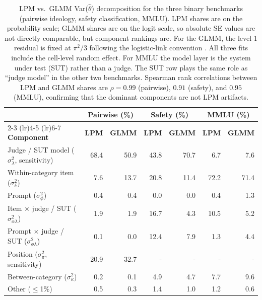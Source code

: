 \begin{table}[ht]
\centering
\caption{LPM vs.\ GLMM Var($\hat\theta$) decomposition for the three binary benchmarks (pairwise ideology, safety classification, MMLU). LPM shares are on the probability scale; GLMM shares are on the logit scale, so absolute SE values are not directly comparable, but component rankings are. For the GLMM, the level-1 residual is fixed at $\pi^2/3$ following the logistic-link convention \citep{nakagawa2010repeatability}. All three fits include the cell-level random effect. For MMLU the model layer is the system under test (SUT) rather than a judge. The SUT row plays the same role as ``judge model'' in the other two benchmarks. Spearman rank correlations between LPM and GLMM shares are $\rho = 0.99$ (pairwise), $0.91$ (safety), and $0.95$ (MMLU), confirming that the dominant components are not LPM artifacts.}
\label{tab:glmm_comparison}
\footnotesize
\begin{tabular}{lrrrrrr}
\toprule
& \multicolumn{2}{c}{\textbf{Pairwise (\%)}} & \multicolumn{2}{c}{\textbf{Safety (\%)}} & \multicolumn{2}{c}{\textbf{MMLU (\%)}} \\
\cmidrule(lr){2-3} \cmidrule(lr){4-5} \cmidrule(lr){6-7}
\textbf{Component} & \textbf{LPM} & \textbf{GLMM} & \textbf{LPM} & \textbf{GLMM} & \textbf{LPM} & \textbf{GLMM} \\
\midrule
Judge / SUT model ($\sigma^2_\lambda$, sensitivity) & 68.4 & 50.9 & 43.8 & 70.7 &  6.7 &  7.6 \\
Within-category item ($\sigma^2_\delta$)            &  7.6 & 13.7 & 20.8 & 11.4 & 72.2 & 71.4 \\
Prompt ($\sigma^2_\phi$)                            &  0.4 &  0.4 &  0.0 &  0.0 &  0.4 &  1.3 \\
Item $\times$ judge / SUT ($\sigma^2_{\alpha\lambda}$) &  1.9 &  1.9 & 16.7 &  4.3 & 10.5 &  5.2 \\
Prompt $\times$ judge / SUT ($\sigma^2_{\phi\lambda}$) &  0.1 &  0.0 & 12.4 &  7.9 &  1.3 &  4.4 \\
Position ($\sigma^2_\pi$, sensitivity)              & 20.9 & 32.7 & -    & -    & -    & -    \\
Between-category ($\sigma^2_\kappa$)                &  0.2 &  0.1 &  4.9 &  4.7 &  7.7 &  9.6 \\
Other ($\leq$1\%)                                   &  0.5 &  0.3 &  1.4 &  1.0 &  1.2 &  0.6 \\
\bottomrule
\end{tabular}
\end{table}

